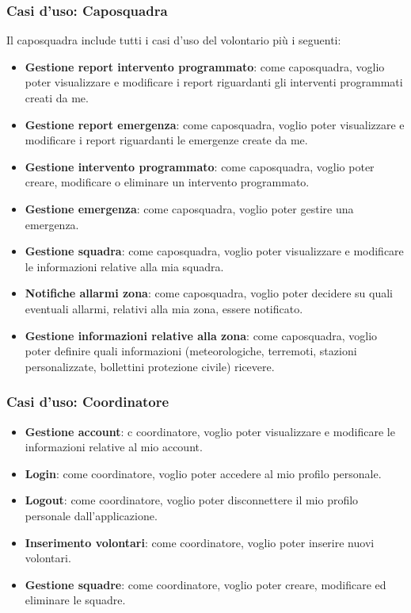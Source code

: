 \subsubsection{Casi d'uso: Caposquadra}
Il caposquadra include tutti i casi d'uso del volontario più i seguenti:
\begin{itemize}
	\item \textbf{Gestione report intervento programmato}:
	come caposquadra, voglio poter visualizzare e modificare i report riguardanti gli interventi programmati creati da me.
	
	\item \textbf{Gestione report emergenza}:
	come caposquadra, voglio poter visualizzare e modificare i report riguardanti le emergenze create da me.
	
	\item \textbf{Gestione intervento programmato}:
	come caposquadra, voglio poter creare, modificare o eliminare un intervento programmato.
	
	\item \textbf{Gestione emergenza}:
	come caposquadra, voglio poter gestire una emergenza.
	
	\item \textbf{Gestione squadra}:
	come caposquadra, voglio poter visualizzare e modificare le informazioni relative alla mia squadra.
	
	\item \textbf{Notifiche allarmi zona}:
	come caposquadra, voglio poter decidere su quali eventuali allarmi, relativi alla mia zona, essere notificato.
	
	\item \textbf{Gestione informazioni relative alla zona}:
	come caposquadra, voglio poter definire quali informazioni (meteorologiche, terremoti, stazioni personalizzate, bollettini protezione civile) ricevere.
\end{itemize}




\subsubsection{Casi d'uso: Coordinatore}
\begin{itemize}
	\item \textbf{Gestione account}:
	c coordinatore, voglio poter visualizzare e modificare le informazioni relative al mio account.
	
	\item \textbf{Login}:
	come coordinatore, voglio poter accedere al mio profilo personale.
	
	\item \textbf{Logout}:
	come coordinatore, voglio poter disconnettere il mio profilo personale dall'applicazione.
	
	\item \textbf{Inserimento volontari}:
	come coordinatore, voglio poter inserire nuovi volontari.
	
	\item \textbf{Gestione squadre}:
	come coordinatore, voglio poter creare, modificare ed eliminare le squadre.
\end{itemize}


